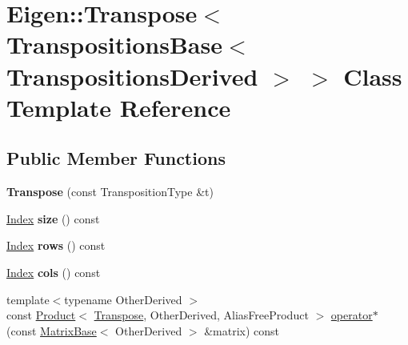 \hypertarget{class_eigen_1_1_transpose_3_01_transpositions_base_3_01_transpositions_derived_01_4_01_4}{}\section{Eigen\+:\+:Transpose$<$ Transpositions\+Base$<$ Transpositions\+Derived $>$ $>$ Class Template Reference}
\label{class_eigen_1_1_transpose_3_01_transpositions_base_3_01_transpositions_derived_01_4_01_4}
\subsection*{Public Member Functions}
\begin{DoxyCompactItemize}
\item 
\mbox{\label{class_eigen_1_1_transpose_3_01_transpositions_base_3_01_transpositions_derived_01_4_01_4_a889982c74c9f28938fa03c82f7ff87d2}} 
{\bfseries Transpose} (const Transposition\+Type \&t)
\item 
\mbox{\label{class_eigen_1_1_transpose_3_01_transpositions_base_3_01_transpositions_derived_01_4_01_4_aac6ec07520b1bc9354a81e0aacffb39b}} 
\hyperlink{namespace_eigen_a62e77e0933482dafde8fe197d9a2cfde}{Index} {\bfseries size} () const
\item 
\mbox{\label{class_eigen_1_1_transpose_3_01_transpositions_base_3_01_transpositions_derived_01_4_01_4_ac225e11ad1604cd750063aab9332e211}} 
\hyperlink{namespace_eigen_a62e77e0933482dafde8fe197d9a2cfde}{Index} {\bfseries rows} () const
\item 
\mbox{\label{class_eigen_1_1_transpose_3_01_transpositions_base_3_01_transpositions_derived_01_4_01_4_a158f9b2ba450e4b2b5965e864b87c853}} 
\hyperlink{namespace_eigen_a62e77e0933482dafde8fe197d9a2cfde}{Index} {\bfseries cols} () const
\item 
{\footnotesize template$<$typename Other\+Derived $>$ }\\const \hyperlink{group___core___module_class_eigen_1_1_product}{Product}$<$ \hyperlink{group___core___module_class_eigen_1_1_transpose}{Transpose}, Other\+Derived, Alias\+Free\+Product $>$ \hyperlink{class_eigen_1_1_transpose_3_01_transpositions_base_3_01_transpositions_derived_01_4_01_4_aa221d105a46384dde9c221bc0d6c7c43}{operator$\ast$} (const \hyperlink{group___core___module_class_eigen_1_1_matrix_base}{Matrix\+Base}$<$ Other\+Derived $>$ \&matrix) const

\end{DoxyCompactItemize}
